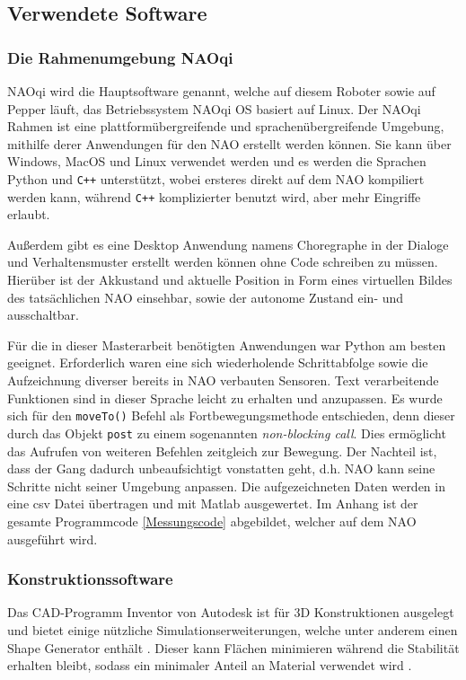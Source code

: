 \subsection{Verwendete Software} \label{software}
\subsubsection*{Die Rahmenumgebung NAOqi}
NAOqi wird die Hauptsoftware genannt, welche auf diesem Roboter sowie auf Pepper läuft, das Betriebssystem NAOqi OS basiert auf Linux. Der NAOqi Rahmen ist eine plattformübergreifende und sprachenübergreifende Umgebung, mithilfe derer Anwendungen für den NAO erstellt werden können. Sie kann über Windows, MacOS und Linux verwendet werden und es werden die Sprachen Python und \texttt{C++} unterstützt, wobei ersteres direkt auf dem NAO kompiliert werden kann, während \texttt{C++} komplizierter benutzt wird, aber mehr Eingriffe erlaubt. \cite[/Former NAOqi Framework/Key concepts]{naoqi_dev_guide}

Außerdem gibt es eine Desktop Anwendung namens Choregraphe in der Dialoge und Verhaltensmuster erstellt werden können ohne Code schreiben zu müssen. Hierüber ist der Akkustand und aktuelle Position in Form eines virtuellen Bildes des tatsächlichen NAO einsehbar, sowie der autonome Zustand ein- und ausschaltbar. \cite[/Choregraphe Suite/What is Choregraphe]{naoqi_dev_guide}

Für die in dieser Masterarbeit benötigten Anwendungen war Python am besten geeignet. Erforderlich waren eine sich wiederholende Schrittabfolge sowie die Aufzeichnung diverser bereits in NAO verbauten Sensoren. Text verarbeitende Funktionen sind in dieser Sprache leicht zu erhalten und anzupassen. Es wurde sich für den \texttt{moveTo()} Befehl als Fortbewegungsmethode entschieden, denn dieser durch das Objekt \texttt{post} zu einem sogenannten \textit{non-blocking call}. Dies ermöglicht das Aufrufen von weiteren Befehlen zeitgleich zur Bewegung. Der Nachteil ist, dass der Gang dadurch unbeaufsichtigt vonstatten geht, d.h. NAO kann seine Schritte nicht seiner Umgebung anpassen. Die aufgezeichneten Daten werden in eine csv Datei übertragen und mit Matlab ausgewertet. Im Anhang ist der gesamte Programmcode \ref{Messungscode} abgebildet, welcher auf dem NAO ausgeführt wird. 

\subsubsection*{Konstruktionssoftware}	
Das CAD-Programm Inventor von Autodesk ist für 3D Konstruktionen ausgelegt und bietet einige nützliche Simulationserweiterungen, welche unter anderem einen Shape Generator enthält \cite{inventor}. Dieser kann Flächen minimieren während die Stabilität erhalten bleibt, sodass ein minimaler Anteil an Material verwendet wird \cite{shape_generator}. 

